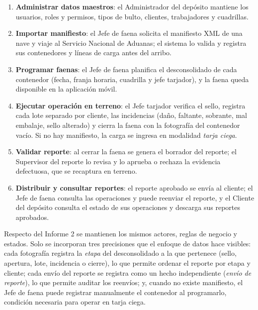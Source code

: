 \begin{enumerate}
    \item \textbf{Administrar datos maestros}: el Administrador del depósito mantiene los
    usuarios, roles y permisos, tipos de bulto, clientes, trabajadores y cuadrillas.
    \item \textbf{Importar manifiesto}: el Jefe de faena solicita el manifiesto XML de una nave
    y viaje al Servicio Nacional de Aduanas; el sistema lo valida y registra sus contenedores
    y líneas de carga antes del arribo.
    \item \textbf{Programar faenas}: el Jefe de faena planifica el desconsolidado de cada
    contenedor (fecha, franja horaria, cuadrilla y jefe tarjador), y la faena queda disponible
    en la aplicación móvil.
    \item \textbf{Ejecutar operación en terreno}: el Jefe tarjador verifica el sello, registra
    cada lote separado por cliente, las incidencias (daño, faltante, sobrante, mal embalaje,
    sello alterado) y cierra la faena con la fotografía del contenedor vacío. Si no hay
    manifiesto, la carga se ingresa en modalidad \emph{tarja ciega}.
    \item \textbf{Validar reporte}: al cerrar la faena se genera el borrador del reporte; el
    Supervisor del reporte lo revisa y lo aprueba o rechaza la evidencia defectuosa, que se
    recaptura en terreno.
    \item \textbf{Distribuir y consultar reportes}: el reporte aprobado se envía al cliente; el
    Jefe de faena consulta las operaciones y puede reenviar el reporte, y el Cliente del
    depósito consulta el estado de sus operaciones y descarga sus reportes aprobados.
\end{enumerate}

Respecto del Informe 2 se mantienen los mismos actores, reglas de negocio y estados. Solo se
incorporan tres precisiones que el enfoque de datos hace visibles: cada fotografía registra la
\emph{etapa} del desconsolidado a la que pertenece (sello, apertura, lote, incidencia o cierre),
lo que permite ordenar el reporte por etapa y cliente; cada envío del reporte se registra como
un hecho independiente (\emph{envío de reporte}), lo que permite auditar los reenvíos; y,
cuando no existe manifiesto, el Jefe de faena puede registrar manualmente el contenedor al
programarlo, condición necesaria para operar en tarja ciega.
